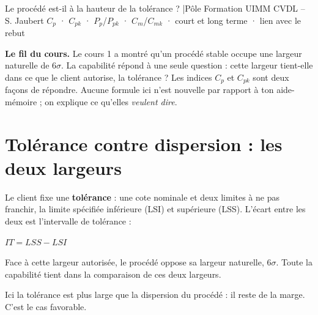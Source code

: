 \documentclass[11pt]{article}
\begin{document}
{Le procédé est-il à la hauteur de la tolérance ? \quad|\quad Pôle Formation UIMM CVDL – S. Jaubert}
{$C_p$ · $C_{pk}$ · $P_p$/$P_{pk}$ · $C_m$/$C_{mk}$ · court et long terme · lien avec le rebut}

\begin{lead}
\textbf{\color{uimmblue}Le fil du cours.} Le cours 1 a montré qu'un procédé stable occupe une largeur naturelle de $6\sigma$. La capabilité répond à une seule question : cette largeur tient-elle dans ce que le client autorise, la tolérance ? Les indices $C_p$ et $C_{pk}$ sont deux façons de répondre. Aucune formule ici n'est nouvelle par rapport à ton aide-mémoire ; on explique ce qu'elles \emph{veulent dire}.
\end{lead}

\section{Tolérance contre dispersion : les deux largeurs}

Le client fixe une \textbf{tolérance} : une cote nominale et deux limites à ne pas franchir, la limite spécifiée inférieure (LSI) et supérieure (LSS). L'écart entre les deux est l'intervalle de tolérance :
\begin{formulebox}
$\displaystyle IT = LSS - LSI$
\end{formulebox}
Face à cette largeur autorisée, le procédé oppose sa largeur naturelle, $6\sigma$. Toute la capabilité tient dans la comparaison de ces deux largeurs.

\begin{center}
\end{center}
\begin{center}\footnotesize\color{uimmgrey}Ici la tolérance est plus large que la dispersion du procédé : il reste de la marge. C'est le cas favorable.\end{center}
\end{document}
